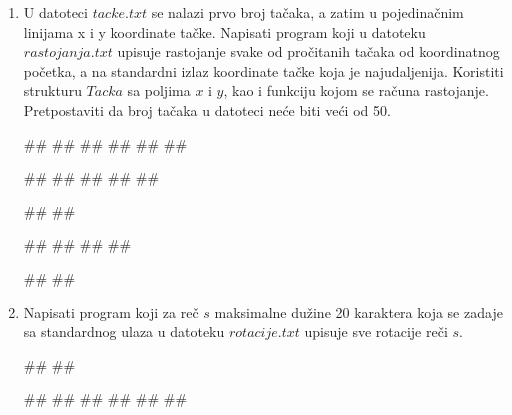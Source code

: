 \begin{enumerate}
\begin{miditest}
\begin{upotreba}{1}
#\naslovIzlaz#
##
\end{upotreba}
\end{miditest}

\item U datoteci $tacke.txt$ se nalazi prvo broj tačaka, a zatim u pojedinačnim linijama x i y koordinate tačke. Napisati program koji u datoteku $rastojanja.txt$ upisuje rastojanje svake od pročitanih tačaka od koordinatnog početka, a na standardni izlaz koordinate tačke koja je najudaljenija. Koristiti strukturu $Tacka$ sa poljima $x$ i $y$, kao i funkciju kojom se računa rastojanje. Pretpostaviti da broj tačaka u datoteci neće biti veći od 50. \\  
\begin{miditest}
\begin{upotreba}{1}
##
##
##
##
##
##

##
##
##
##
##

#\naslovIzlaz#
##
\end{upotreba}
\end{miditest}
\begin{miditest}
\begin{upotreba}{1}
##
##
##
##

#\naslovIzlaz#
##
\end{upotreba}
\end{miditest}

\item Napisati program koji za reč $s$ maksimalne dužine 20 karaktera koja se zadaje sa standardnog ulaza u datoteku $rotacije.txt$ upisuje sve rotacije reči $s$. \\
\begin{miditest}
\begin{upotreba}{1}
#\naslovInt#
##

##
##
##
##
##
##
\end{upotreba}
\end{miditest}



\end{enumerate}
